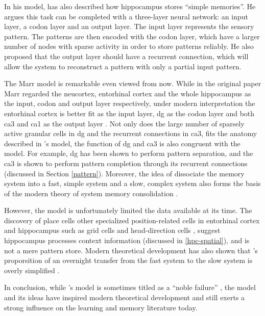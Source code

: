 In his model, \citet{marr71} has also described how hippocampus stores ``simple memories''. He argues this task can be completed with a three-layer neural network: an input layer, a codon layer and an output layer. The input layer represents the sensory pattern. The patterns are then encoded with the codon layer, which have a larger number of nodes with sparse activity in order to store patterns reliably. He also proposed that the output layer should have a recurrent connection, which will allow the system to reconstruct a pattern with only a partial input pattern. 

The Marr model is remarkable even viewed from now. While in the original paper Marr \citep{marr71} regarded the neucortex, entorhinal cortex and the whole hippocampus as the input, codon and output layer respectively, under modern interpretation the entorhinal cortex is better fit as the input layer, \gls{dg} as the codon layer and both \gls{ca3} and \gls{ca1} as the output layer \citep{willshaw15}. Not only does the large number of sparsely active granular cells in \gls{dg} and the recurrent connections in \gls{ca3}, fits the anatomy described in \citet{marr71}'s model, the function of \gls{dg} and \gls{ca3} is also congruent with the model. For example, \gls{dg} has been shown to perform pattern separation, and the \gls{ca3} is shown to perform pattern completion through its recurrent connections (discussed in Section \ref{pattern}).  Moreover, the idea of dissociate the memory system into a fast, simple system and a slow, complex system also forms the basis of the modern theory of system memory consolidation \citep{squire92, mcclelland13}. 

However, the \citet{marr71} model is unfortunately limited the data available at its time. The discovery of place cells \citep{o'keefe71} other specialized position-related cells in entorhinal cortex and hippocampus such as grid cells and head-direction cells \citep{taube90, fyhn04, hafting05}, suggest hippocampus processes context information (discussed in \ref{hpc-spatial}), and is not a mere pattern store. Modern theoretical development has also shown that \citet{marr71}'s proporsition of an overnight transfer from the fast system to the slow system is overly simplified . 

In conclusion, while \citet{marr71}'s model is sometimes titled as a ``noble failure'' \citep{willshaw15}, the model and its ideas have inspired modern theoretical development and still exerts a strong influence on the learning and memory literature today. 





